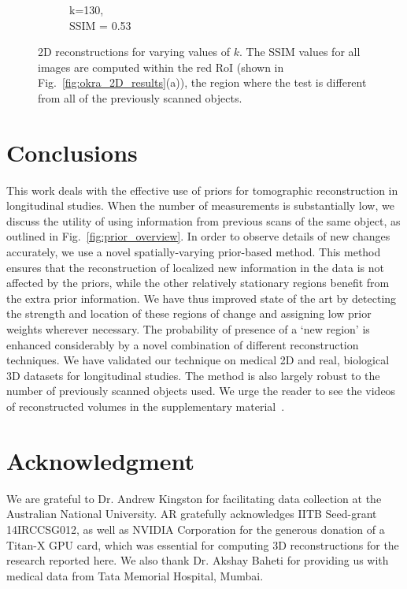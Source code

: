 \documentclass[journal]{IEEEtran}
\begin{document}
\begin{figure}[h]
\begin{subfigure}[b]{0.24\linewidth}
        \caption{k=130,\\ SSIM = 0.53}
     \end{subfigure}
    \caption{2D reconstructions for varying values of $k$. The SSIM values for all images are computed within the red RoI (shown in Fig.~\ref{fig:okra_2D_results}(a)), the region where the test is different from all of the previously scanned objects.}
\label{fig:reconstructions_as_k_varies}
\end{figure}


\section{Conclusions}
\label{sec:conclusions}
This work deals with the effective use of priors for tomographic
reconstruction in longitudinal studies. When the number of measurements is
substantially low, we discuss the utility of
using information from previous scans of the same object, as outlined in
Fig.~\ref{fig:prior_overview}. In order to observe details of new changes
accurately, we use a novel
spatially-varying prior-based method. This method ensures that the
reconstruction of localized new information in the data is not
affected by the priors, while the other relatively stationary regions benefit from the extra prior information. %
We have thus
improved state of the art by detecting the strength and location
of these regions of change and
assigning low prior weights wherever necessary. The probability of
presence of a `new region' is enhanced considerably by a novel
combination of different reconstruction techniques.  We have validated
our technique on medical 2D and real, biological 3D datasets for
longitudinal studies. The method is also largely robust to the number
of previously scanned objects used. We urge the reader to see the
videos of reconstructed volumes in the supplementary
material~\cite{supp_paper}.

\section{Acknowledgment}
We are grateful to Dr. Andrew Kingston for facilitating data
collection at the Australian National University. AR gratefully
acknowledges IITB Seed-grant 14IRCCSG012, as well as NVIDIA
Corporation for the generous donation of a Titan-X GPU card, which was
essential for computing 3D reconstructions for the research reported
here. We also thank Dr. Akshay Baheti for providing us with medical
data from Tata Memorial Hospital, Mumbai.
{%
}
\end{document}
